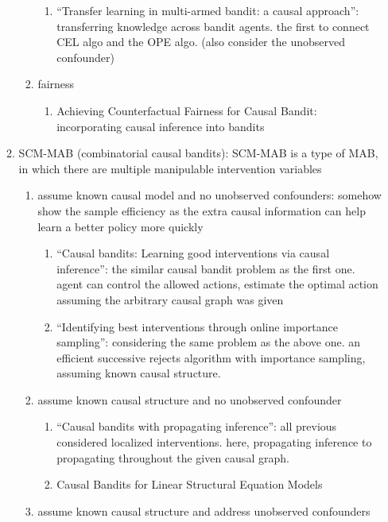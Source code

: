 \begin{enumerate}
\begin{enumerate}
\begin{enumerate}
\begin{enumerate}
                \item “Transfer learning in multi-armed bandit: a causal approach”: transferring knowledge across bandit agents. the first to connect CEL algo and the OPE algo. (also consider the unobserved confounder)
            \end{enumerate}
            \item fairness
            \begin{enumerate}
                \item Achieving Counterfactual Fairness for Causal Bandit: incorporating causal inference into bandits
        
            \end{enumerate}
        \end{enumerate}
    \item SCM-MAB (combinatorial causal bandits): SCM-MAB is a type of MAB, in which there are multiple manipulable intervention variables
        \begin{enumerate}
        \item assume known causal model and no unobserved confounders: somehow show the sample efficiency as the extra causal information can help learn a better policy more quickly
        \begin{enumerate}
            \item “Causal bandits: Learning good interventions via causal inference”: the similar causal bandit problem as the first one. agent can control the allowed actions, estimate the optimal action assuming the arbitrary causal graph was given
            \item “Identifying best interventions through online importance sampling”: considering the same problem as the above one. an efficient successive rejects algorithm with importance sampling, assuming known causal structure.
        \end{enumerate} 
        \item assume known causal structure and no unobserved confounder
        \begin{enumerate}
            \item “Causal bandits with propagating inference”: all previous considered localized interventions. here, propagating inference to propagating throughout the given causal graph.
            \item Causal Bandits for Linear Structural Equation Models
        \end{enumerate}
        \item assume known causal structure and address unobserved confounders

\end{enumerate}
\end{enumerate}
\end{enumerate}
